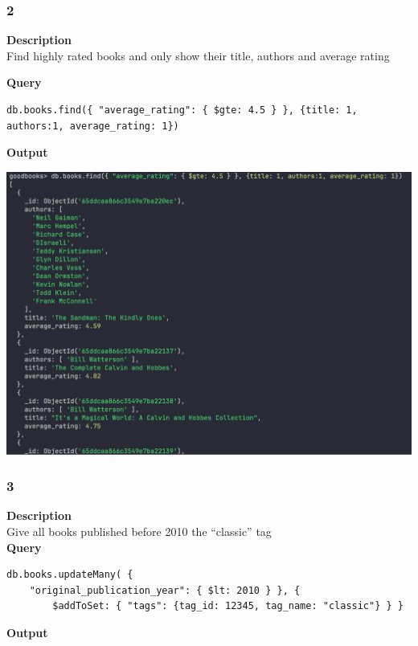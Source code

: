 \documentclass[11pt]{article}
\begin{document}
\subsubsection{2}
\label{sec:orgbeb157a}
\textbf{Description}\\
Find highly rated books and only show their title, authors and average rating

\linebreak
\textbf{Query}
\begin{verbatim}
db.books.find({ "average_rating": { $gte: 4.5 } }, {title: 1, authors:1, average_rating: 1})
\end{verbatim}

\linebreak
\textbf{Output}\\
\begin{center}
\includegraphics[width=1\textwidth]{images/KFWJOR001/2.png}
\end{center}
\pagebreak
\subsubsection{3}
\label{sec:orgf276176}
\textbf{Description}\\
Give all books published before 2010 the “classic” tag\\
\linebreak
\textbf{Query}
\begin{verbatim}
db.books.updateMany( {
    "original_publication_year": { $lt: 2010 } }, {
        $addToSet: { "tags": {tag_id: 12345, tag_name: "classic"} } }
\end{verbatim}
\linebreak
\textbf{Output}\\
\end{document}
